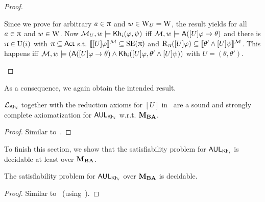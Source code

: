 \begin{proof}
\begin{itemize}
	Since we prove for arbitrary $a \in \uppi$ and $w \in \operatorname{W}_{{U}} = \operatorname{W}$, the result yields for all $a \in \uppi$ and $w \in \operatorname{W}$.
	Now $\mathcal{M}_{{U}},w \models {\sf Kh}_i(\varphi,\psi)$ iff $\mathcal{M},w \models {\sf A}([U]\varphi \rightarrow \theta)$ and there is $\uppi \in \operatorname{U}(i)$ with $\uppi \subseteq {\rm \sf Act}$ s.t. $\llbracket [U]\varphi \rrbracket^{\mathcal{M}} \subseteq \operatorname{SE}(\uppi)$ and $\operatorname{R}_\uppi([U]\varphi) \subseteq \llbracket \theta' \wedge [U]\psi \rrbracket^{\mathcal{M}}$.
	This happens iff $\mathcal{M},w \models ({\sf A}([U]\varphi \rightarrow \theta) \wedge {\sf Kh}_i([U]\varphi,\theta' \wedge [U]\psi))$ with $U = (\theta,\theta')$.
	\end{itemize}
\end{proof}

As a consequence, we again obtain the intended result.

\medskip 

\begin{theorem}\label{th:aulcomplete}
$\mathcal{L}_{{\sf Kh}_i}$ together with the reduction axioms for $[U]$ in~ are a sound and strongly complete axiomatization for $\mathsf{AUL}_{{\sf Kh}_i}$ w.r.t. $\mathbf{M}_{\mathbf{BA}}$.
\end{theorem}

\begin{proof}
Similar to~.
\end{proof}

To finish this section, we show that the satisfiability problem for $\mathsf{AUL}_{{\sf Kh}_i}$ is decidable at least over $\mathbf{M}_{\mathbf{BA}}$.

\medskip 

\begin{corollary}\label{cor:aulsat}
The satisfiability problem for $\mathsf{AUL}_{{\sf Kh}_i}$ over $\mathbf{M}_{\mathbf{BA}}$ is decidable.
\end{corollary}
\begin{proof}
Similar to~ (using~).
\end{proof}
